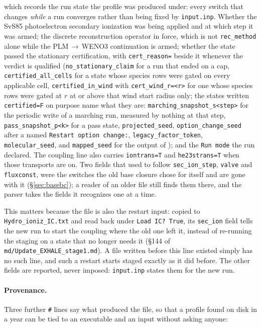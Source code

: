 \documentclass[english,a4paper]{my_memo}
\begin{document}
\noindent which records the run state the profile was produced under: every
switch that changes \emph{while} a run converges rather than being fixed by
\texttt{input.inp}. Whether the SvS85 photoelectron secondary ionization was
being applied and at which step it was armed; the discrete reconstruction
operator in force, which is not \texttt{rec\_method} alone while the
PLM\,$\to$\,WENO3 continuation is armed; whether the state passed the
stationary certification, with \texttt{cert\_reason=} beside it whenever the
verdict is qualified (\texttt{no\_stationary\_claim} for a run that ended on
a cap, \texttt{certified\_all\_cells} for a state whose species rows were
gated on every applicable cell, \texttt{certified\_in\_wind} with
\texttt{cert\_wind\_r=<r>} for one whose
species rows were gated at $r$ at or above that wind start radius only; the states written \texttt{certified=F} on purpose name
what they are: \texttt{marching\_snapshot\_s<step>} for the periodic write of
a marching run, measured by nothing at that step, \texttt{pass\_snapshot\_p<k>}
for a pass state, \texttt{projected\_seed}, \texttt{option\_change\_seed} after
a named \texttt{Restart option change:}, \texttt{legacy\_factor\_token},
\texttt{molecular\_seed}, and \texttt{mapped\_seed} for the output of
); and the \texttt{Run mode} the run declared.
The coupling line also carries \texttt{iontrans=T} and \texttt{he23strans=T}
when those transports are on. Two fields
that used to follow \texttt{sec\_ion\_step}, \texttt{valve} and
\texttt{fluxconst}, were the switches the old base closure chose for itself
and are gone with it (\S\ref{sec:basebc}); a reader of an older file still
finds them there, and the parser takes the fields it recognizes one at a
time.

This matters because the file is also the restart input: copied to
\texttt{Hydro\_ioniz\_IC.txt} and read back under \texttt{Load IC? True}, its
\texttt{sec\_ion} field tells the new run to start the coupling where the old
one left it, instead of re-running the staging on a state that no longer needs
it (\S144 of \texttt{md/Update\_EXHALE\_stage1.md}). A file written before this line
existed simply has no such line, and such a restart starts staged exactly as it
did before. The other fields are reported, never imposed:
\texttt{input.inp} states them for the new run.

\paragraph{Provenance.} Three further \texttt{\#} lines say what produced the
file, so that a profile found on disk in a year can be tied to an executable and
an input without asking anyone:
\end{document}
